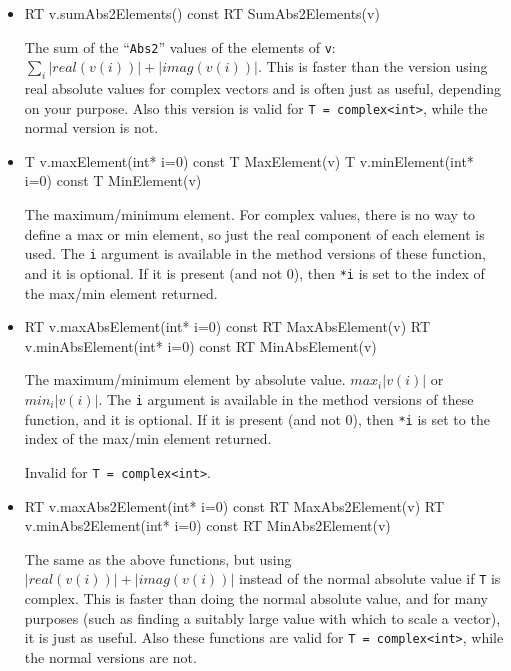 \documentclass[twoside,letterpaper,11pt]{article}
\renewcommand{\tt}[1]{{\lstinline {#1}}}
\begin{document}
\begin{itemize}
\item
\begin{tmvcode}
RT v.sumAbs2Elements() const
RT SumAbs2Elements(v)
\end{tmvcode}
The sum of the ``\tt{Abs2}'' values of the elements of \tt{v}: $\sum_i |real(v(i))| + |imag(v(i))|$.
This is faster than the version using real absolute values for
complex vectors and is often just as useful, depending on your purpose.  Also this version
is valid for \tt{T = complex<int>}, while the normal version is not.

\item
\begin{tmvcode}
T v.maxElement(int* i=0) const
T MaxElement(v)
T v.minElement(int* i=0) const
T MinElement(v)
\end{tmvcode}
The maximum/minimum element.  For complex values, there is no way to define a 
max or min element, so just the real component of each element is used.
The \tt{i} argument is available in the method versions of these function, and it is optional.
If it is present (and not 0), then \tt{*i} is set to the 
index of the max/min element returned.

\item
\begin{tmvcode}
RT v.maxAbsElement(int* i=0) const
RT MaxAbsElement(v)
RT v.minAbsElement(int* i=0) const
RT MinAbsElement(v)
\end{tmvcode}
The maximum/minimum element by absolute value.  $max_i |v(i)|$ or $min_i |v(i)|$.
The \tt{i} argument is available in the method versions of these function, and it is optional.
If it is present (and not 0), then \tt{*i} is set to the 
index of the max/min element returned.  

Invalid for \tt{T = complex<int>}.

\item
\begin{tmvcode}
RT v.maxAbs2Element(int* i=0) const
RT MaxAbs2Element(v)
RT v.minAbs2Element(int* i=0) const
RT MinAbs2Element(v)
\end{tmvcode}
The same as the above functions, but using
$|real(v(i))| + |imag(v(i))|$ instead of the normal absolute value if \tt{T} is complex.  
This is faster than doing
the normal absolute value, and for many purposes (such as finding a suitably large value
with which to scale a vector), it is just as useful.  Also these functions are
valid for \tt{T = complex<int>}, while the normal versions are not.

\end{itemize}
\end{document}

